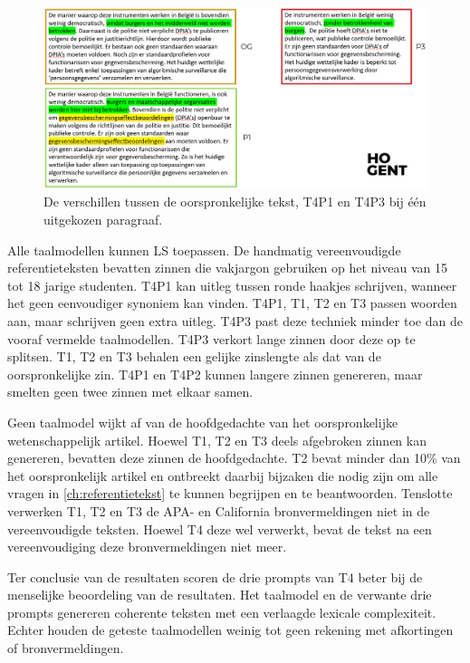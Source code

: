 \begin{figure}[H]
	\includegraphics[width=\linewidth]{img/vergelijking.png}
	\caption{De verschillen tussen de oorspronkelijke tekst, T4P1 en T4P3 bij één uitgekozen paragraaf.}
	\label{img:vergelijking-taalmodellen}
\end{figure}

Alle taalmodellen kunnen LS toepassen. De handmatig vereenvoudigde referentieteksten bevatten zinnen die vakjargon gebruiken op het niveau van 15 tot 18 jarige studenten. T4P1 kan uitleg tussen ronde haakjes schrijven, wanneer het geen eenvoudiger synoniem kan vinden. T4P1, T1, T2 en T3 passen woorden aan, maar schrijven geen extra uitleg. T4P3 past deze techniek minder toe dan de vooraf vermelde taalmodellen. T4P3 verkort lange zinnen door deze op te splitsen. T1, T2 en T3 behalen een gelijke zinslengte als dat van de oorspronkelijke zin. T4P1 en T4P2 kunnen langere zinnen genereren, maar smelten geen twee zinnen met elkaar samen. 

\medspace

Geen taalmodel wijkt af van de hoofdgedachte van het oorspronkelijke wetenschappelijk artikel. Hoewel T1, T2 en T3 deels afgebroken zinnen kan genereren, bevatten deze zinnen de hoofdgedachte. T2 bevat minder dan 10\% van het oorspronkelijk artikel en ontbreekt daarbij bijzaken die nodig zijn om alle vragen in \ref{ch:referentietekst} te kunnen begrijpen en te beantwoorden. Tenslotte verwerken T1, T2 en T3 de APA- en California bronvermeldingen niet in de vereenvoudigde teksten. Hoewel T4 deze wel verwerkt, bevat de tekst na een vereenvoudiging deze bronvermeldingen niet meer.

\medspace

Ter conclusie van de resultaten scoren de drie prompts van T4 beter bij de menselijke beoordeling van de resultaten. Het taalmodel en de verwante drie prompts genereren coherente teksten met een verlaagde lexicale complexiteit. Echter houden de geteste taalmodellen weinig tot geen rekening met afkortingen of bronvermeldingen.

